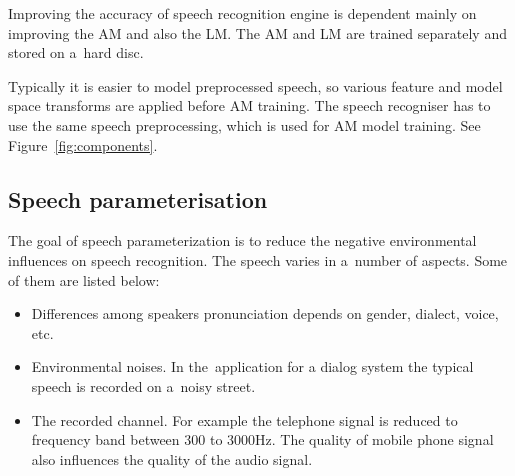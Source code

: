 Improving the accuracy of speech recognition engine is dependent
mainly on improving the \ac{AM} and also the \ac{LM}.
The \ac{AM} and \ac{LM} are trained separately 
and stored on a~hard disc.

Typically it is easier to model preprocessed speech, 
so various feature and model space transforms are applied before \ac{AM} training.
The speech recogniser has to use the same speech preprocessing,
which is used for \ac{AM} model training.
See Figure~\ref{fig:components}.


% 


\subsection{Speech parameterisation}
\label{sub:param}
The goal of speech parameterization is to reduce the negative environmental influences on speech recognition.
The speech varies in a~number of aspects. Some of them are listed below:
\begin{itemize}
    \item Differences among speakers pronunciation depends on gender, dialect, voice, etc.
    \item Environmental noises. In the~application for a dialog system the typical speech is
        recorded on a~noisy street. 
    \item The recorded channel. 
        For example the telephone signal is reduced to frequency band between 300 to 3000Hz.
        The quality of mobile phone signal also influences the quality of the audio signal.
\end{itemize}


